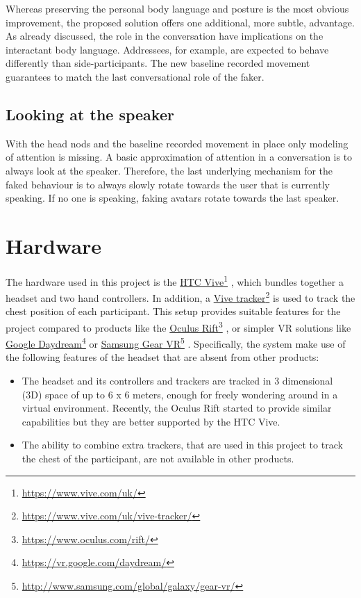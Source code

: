 \documentclass[]{simple-thesis}
\newcommand\fnurl[2]{%
  \href{#2}{#1}\footnote{\url{#2}}%
}
\begin{document}
Whereas preserving the personal body language and posture is the most obvious improvement, the proposed solution offers one additional, more subtle, advantage.
As already discussed, the role in the conversation have implications on the interactant body language.
Addressees, for example, are expected to behave differently than side-participants.
The new baseline recorded movement guarantees to match the last conversational role of the faker.

\subsection{Looking at the speaker}

With the head nods and the baseline recorded movement in place only modeling of attention is missing.
A basic approximation of attention in a conversation is to always look at the speaker.
Therefore, the last underlying mechanism for the faked behaviour is to always slowly rotate towards the user that is currently speaking.
If no one is speaking, faking avatars rotate towards the last speaker.

\section{Hardware}

The hardware used in this project is the \fnurl{HTC Vive}{https://www.vive.com/uk/}, which bundles together a headset and two hand controllers.
In addition, a \fnurl{Vive tracker}{https://www.vive.com/uk/vive-tracker/} is used to track the chest position of each participant.
This setup provides suitable features for the project compared to products like the \fnurl{Oculus Rift}{https://www.oculus.com/rift/}, or simpler VR solutions like \fnurl{Google Daydream}{https://vr.google.com/daydream/} or \fnurl{Samsung Gear VR}{http://www.samsung.com/global/galaxy/gear-vr/}.
Specifically, the system make use of the following features of the headset that are absent from other products:

\begin{itemize}
  \item The headset and its controllers and trackers are tracked in 3 dimensional (3D) space of up to 6 x 6 meters, enough for freely wondering around in a virtual environment. Recently, the Oculus Rift started to provide similar capabilities but they are better supported by the HTC Vive.
  \item The ability to combine extra trackers, that are used in this project to track the chest of the participant, are not available in other products.
\end{itemize}
\end{document}
